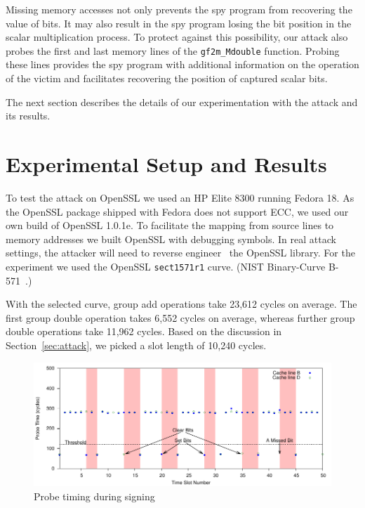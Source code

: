 \documentclass[twocolumn]{svjour3}
\newcommand{\myupcase}[1]{\uppercase{#1}}
\begin{document}
Missing memory accesses not only prevents the spy program from recovering the value of bits.
It may also result in the spy program losing the bit position in the scalar multiplication process.
To protect against this possibility, our attack also probes the first and last memory lines of the 
\texttt{gf2m\_Mdouble} function.
Probing these lines provides the spy program with additional information on the operation of the victim
and facilitates recovering the position of captured scalar bits.


The next section describes the details of our experimentation with the attack and its results.


\section{Experimental Setup and Results}\label{sec:results}

To test the attack on OpenSSL we used an HP Elite 8300 
running Fedora 18.
As the OpenSSL package shipped with Fedora does not support \myupcase{ecc},
we used our own build of OpenSSL 1.0.1e. 
To facilitate the mapping from source lines to memory addresses we built OpenSSL with debugging symbols.
In real attack settings, the attacker will need to reverse engineer~\cite{cipsero10software}
the OpenSSL library.
For the experiment we used the OpenSSL \texttt{sect1571r1} curve.
(NIST Binary-Curve B-571~\cite{fips}.)

With the selected curve, group add operations take 23,612 cycles on average.
The first group double operation takes 6,552 cycles on average, whereas further group double operations take 11,962 cycles.
Based on the discussion in Section~\ref{sec:attack}, we picked a slot length of 10,240 cycles.


\begin{figure}[htb]
\centering\includegraphics[width=\textwidth]{images/timing}
\caption{Probe timing during signing\label{dgm:timing}}
\end{figure}
\end{document}
